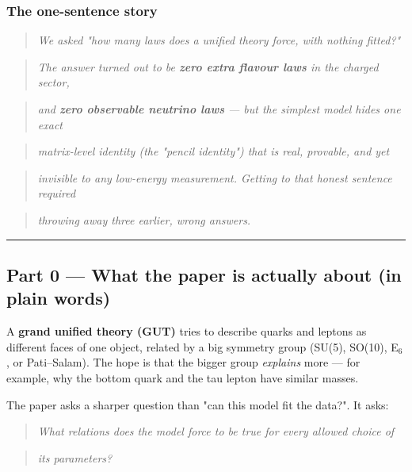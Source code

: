 \documentclass[11pt]{article}
\begin{document}
\subsubsection*{The one-sentence story}

\begin{quote}\emph{We asked "how many laws does a unified theory \emph{force}, with nothing fitted?"}\end{quote}
\begin{quote}\emph{The answer turned out to be \textbf{zero extra flavour laws} in the charged sector,}\end{quote}
\begin{quote}\emph{and \textbf{zero observable neutrino laws} --- but the simplest model hides one \emph{exact}}\end{quote}
\begin{quote}\emph{\emph{matrix-level identity} (the "pencil identity") that is real, provable, and yet}\end{quote}
\begin{quote}\emph{invisible to any low-energy measurement. Getting to that honest sentence required}\end{quote}
\begin{quote}\emph{throwing away three earlier, wrong answers.}\end{quote}

\vspace{4pt}\hrule\vspace{4pt}

\subsection*{Part 0 --- What the paper is actually about (in plain words)}

A \textbf{grand unified theory (GUT)} tries to describe quarks and leptons as different
faces of one object, related by a big symmetry group (SU(5), SO(10), E$_6$, or
Pati--Salam). The hope is that the bigger group \emph{explains} more --- for example, why
the bottom quark and the tau lepton have similar masses.

The paper asks a sharper question than "can this model fit the data?". It asks:

\begin{quote}\emph{\emph{What relations does the model force to be true for \emph{every} allowed choice of}}\end{quote}
\begin{quote}\emph{\emph{its parameters?}}\end{quote}
\end{document}
